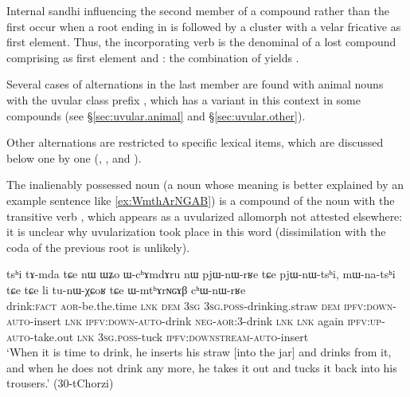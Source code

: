 Internal sandhi influencing the second member of a compound rather than the first occur when a root ending in  is followed by a cluster with a velar fricative as first element. Thus, the incorporating verb  is the denominal of a lost compound  comprising  as first element and : the combination of  yields .

Several cases of alternations in the last member are found with animal nouns with the uvular class prefix , which has a variant  in this context in some compounds (see §\ref{sec:uvular.animal} and §\ref{sec:uvular.other}). 

Other alternations are restricted to specific lexical items, which are discussed below one by one (, ,  and ).

The inalienably possessed noun  (a noun whose meaning is better explained by an example sentence like \ref{ex:WmthArNGAB}) is a compound of the noun  with the transitive verb , which appears as a uvularized allomorph  not attested elsewhere: it is unclear why uvularization took place in this word (dissimilation with the coda  of the previous root is unlikely).

\begin{exe}
\ex \label{ex:WmthArNGAB}
\gll tsʰi tɤ-mda tɕe nɯ ɯʑo ɯ-cʰɤmdɤru nɯ pjɯ-nɯ-rʁe tɕe pjɯ-nɯ-tsʰi, mɯ-na-tsʰi tɕe tɕe li tu-nɯ-χɕoʁ tɕe ɯ-mtʰɤrɴɢɤβ cʰɯ-nɯ-rʁe \\
drink:\textsc{fact} \textsc{aor}-be.the.time \textsc{lnk} \textsc{dem} \textsc{3sg} \textsc{3sg}.\textsc{poss}-drinking.straw \textsc{dem} \textsc{ipfv}:\textsc{down}-\textsc{auto}-insert \textsc{lnk} \textsc{ipfv}:\textsc{down}-\textsc{auto}-drink \textsc{neg}-\textsc{aor}:3\flobv{}-drink \textsc{lnk} \textsc{lnk} again \textsc{ipfv}:\textsc{up}-\textsc{auto}-take.out \textsc{lnk} \textsc{3sg}.\textsc{poss}-tuck \textsc{ipfv}:\textsc{downstream}-\textsc{auto}-insert \\
\glt `When it is time to drink, he inserts his straw [into the jar] and drinks from it, and when he does not drink any more, he takes it out and tucks it back into his trousers.' (30-tChorzi)
\end{exe}
 
